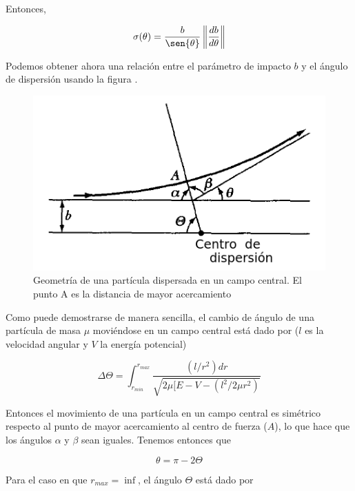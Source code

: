 \documentclass[a4paper,10pt]{article}
\numberwithin{equation}{section}
\begin{document}
Entonces,

\begin{equation}
 \sigma(\theta) = \frac{b}{\sen{\theta}}\left\| \frac{db}{d\theta} \right\|
 \label{eq:disper6}
\end{equation}

Podemos obtener ahora una relación entre el parámetro de impacto $b$ y el 
ángulo de dispersión usando la figura .

\begin{figure}[H]
 \center
 \includegraphics[scale=0.5]{problema3fig3}
 \caption{Geometría de una partícula dispersada en un campo central. El punto
 A es la distancia de mayor acercamiento}
 \label{fig:problema3fig3}
\end{figure}

Como puede demostrarse de manera sencilla, el cambio de ángulo 
de una partícula de masa $\mu$ moviéndose en un campo central está
dado por ($l$ es la velocidad angular y $V$ la energía potencial)

\begin{equation}
 \Delta \Theta = \int_{r_{min}}^{r_{max}} \frac{(l/r^2)dr}{\sqrt{2\mu[
 E - V - (l^2/2\mu r^2)}}
 \label{eq:disper7}
\end{equation}

Entonces el movimiento de una partícula en un campo central es simétrico
respecto al punto de mayor acercamiento al centro de fuerza ($A$), lo que
hace que los ángulos $\alpha$ y $\beta$ sean iguales. Tenemos entonces que 

\begin{equation}
 \theta = \pi - 2\Theta
 \label{eq:disper8}
\end{equation}

Para el caso en que $r_{max} = \inf$, el ángulo $\Theta$ está dado por
\end{document}
